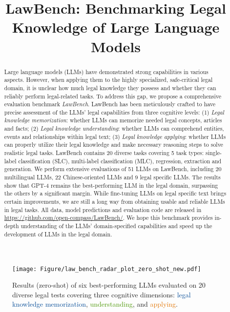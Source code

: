 \title{LawBench: Benchmarking Legal Knowledge of Large Language Models}



\maketitle

\begin{abstract}

Large language models (LLMs) have demonstrated strong capabilities in various aspects. However, when applying them to the highly specialized, safe-critical legal domain, it is unclear how much legal knowledge they possess and whether they can reliably perform legal-related tasks. To address this gap, we propose a comprehensive evaluation benchmark \emph{LawBench}. LawBench has been meticulously crafted to have precise assessment of the LLMs' legal capabilities from three cognitive levels: (1) \emph{Legal knowledge memorization}: whether LLMs can memorize needed legal concepts, articles and facts; (2) \emph{Legal knowledge understanding}: whether LLMs can comprehend entities, events and relationships within legal text; (3) \emph{Legal knowledge applying}: whether LLMs can properly utilize their legal knowledge and make necessary reasoning steps to solve realistic legal tasks. LawBench contains 20 diverse tasks covering 5 task types: single-label classification (SLC), multi-label classification (MLC), regression, extraction and generation. We perform extensive evaluations of 51 LLMs on LawBench, including 20 multilingual LLMs, 22 Chinese-oriented LLMs and 9 legal specific LLMs. The results show that GPT-4 remains the best-performing LLM in the legal domain, surpassing the others by a significant margin. While fine-tuning LLMs on legal specific text brings certain improvements, we are still a long way from obtaining usable and reliable LLMs in legal tasks. All data, model predictions and evaluation code are released in \url{https://github.com/open-compass/LawBench/}. We hope this benchmark provides in-depth understanding of the LLMs' domain-specified capabilities and speed up the development of LLMs in the legal domain.

\end{abstract}

\begin{figure}[t]
    \centering
    \texttt{[image: Figure/law\_bench\_radar\_plot\_zero\_shot\_new.pdf]}
    \caption{Results (zero-shot) of six best-performing LLMs evaluated on 20 diverse legal tests covering three cognitive dimensions: \textcolor[HTML]{004995}{legal knowledge memorization}, \textcolor[HTML]{499500}{understanding}, and \textcolor[HTML]{e17300}{applying}.}
    \label{fig:law_bench_radar_plot}
\end{figure}

